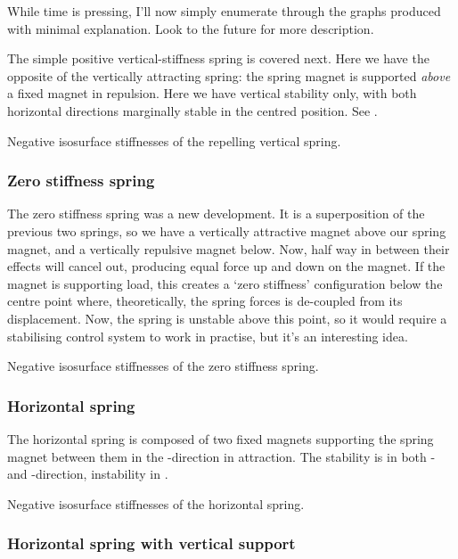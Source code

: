 \documentclass[11pt,a4paper]{memoir}
\begin{document}
While time is pressing, I'll now simply enumerate through the graphs produced
with minimal explanation. Look to the future for more description.

The simple positive vertical-stiffness spring is covered next. Here we have
the opposite of the vertically attracting spring: the spring magnet is
supported \emph{above} a fixed magnet in repulsion. Here we have vertical
stability only, with both horizontal directions marginally stable in the
centred position. See .

  {Negative isosurface stiffnesses of the repelling vertical spring.}

\subsubsection{Zero stiffness spring}

The zero stiffness spring was a new development. It is a superposition of the
previous two springs, so we have a vertically attractive magnet above our
spring magnet, and a vertically repulsive magnet below. Now, half way in
between their effects will cancel out, producing equal force up and down on
the magnet. If the magnet is supporting load, this creates a `zero stiffness'
configuration below the centre point where, theoretically, the spring forces
is de-coupled from its displacement. Now, the spring is unstable above this
point, so it would require a stabilising control system to work in practise,
but it's an interesting idea.

  {Negative isosurface stiffnesses of the zero stiffness spring.}

\subsubsection{Horizontal spring}

The horizontal spring is composed of two fixed magnets supporting the spring
magnet between them in the \x-direction in attraction. The stability is in
both \y- and \z-direction, instability in \x.

  {Negative isosurface stiffnesses of the horizontal spring.}

\subsubsection{Horizontal spring with vertical support}
\end{document}
